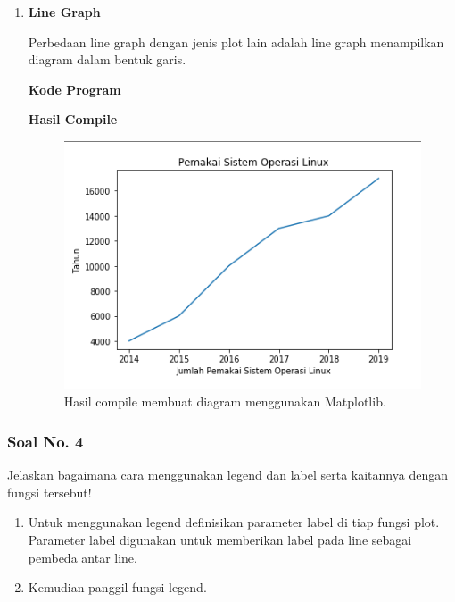 \begin{enumerate}
	\item \textbf{Line Graph}
	
	Perbedaan line graph dengan jenis plot lain adalah line graph menampilkan diagram dalam bentuk garis.
	
	\textbf{Kode Program}
	
	
	
	\textbf{Hasil Compile}
	
	\begin{figure}[H]
		\includegraphics[width=12cm]{figures/6/1174089/Praktek/line.png}
		\centering
		\caption{Hasil compile membuat diagram menggunakan Matplotlib.}
	\end{figure}
	
\end{enumerate}

\subsubsection{Soal No. 4}
\hfill \break
Jelaskan bagaimana cara menggunakan legend dan label serta kaitannya dengan fungsi tersebut!

\begin{enumerate}
	\item Untuk menggunakan legend definisikan parameter label di tiap fungsi plot. Parameter label digunakan untuk memberikan label pada line sebagai pembeda antar line.
	
	
	
	\item Kemudian panggil fungsi legend.
	
	
\end{enumerate}

